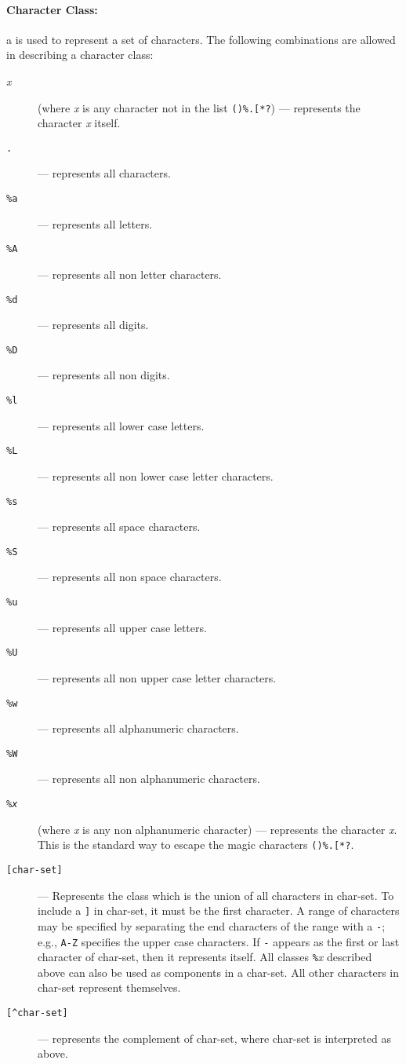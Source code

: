 \paragraph{Character Class:}
a  is used to represent a set of characters.
The following combinations are allowed in describing a character class:
\begin{description}
\item[{\em x}] (where {\em x} is any character not in the list \verb'()%.[*?')
--- represents the character {\em x} itself.
\item[{\tt .}] --- represents all characters.
\item[{\tt \%a}] --- represents all letters.
\item[{\tt \%A}] --- represents all non letter characters.
\item[{\tt \%d}] --- represents all digits.
\item[{\tt \%D}] --- represents all non digits.
\item[{\tt \%l}] --- represents all lower case letters.
\item[{\tt \%L}] --- represents all non lower case letter characters.
\item[{\tt \%s}] --- represents all space characters.
\item[{\tt \%S}] --- represents all non space characters.
\item[{\tt \%u}] --- represents all upper case letters.
\item[{\tt \%U}] --- represents all non upper case letter characters.
\item[{\tt \%w}] --- represents all alphanumeric characters.
\item[{\tt \%W}] --- represents all non alphanumeric characters.
\item[{\tt \%\em x}] (where {\em x} is any non alphanumeric character)  ---
represents the character {\em x}.
This is the standard way to escape the magic characters \verb'()%.[*?'.
\item[{\tt [char-set]}] ---
Represents the class which is the union of all
characters in char-set.
To include a \verb']' in char-set, it must be the first character.
A range of characters may be specified by
separating the end characters of the range with a \verb'-';
e.g., \verb'A-Z' specifies the upper case characters.
If \verb'-' appears as the first or last character of char-set,
then it represents itself.
All classes \verb'%'{\em x} described above can also be used as
components in a char-set.
All other characters in char-set represent themselves.
\item[{\tt [\^{ }char-set]}] ---
represents the complement of char-set,
where char-set is interpreted as above.
\end{description}

